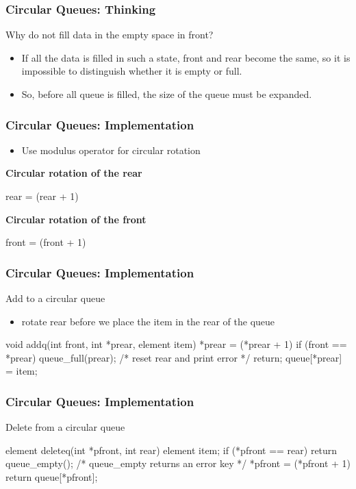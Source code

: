 \documentclass[newPxFont,sthlmFooter,nooffset]{beamer}
\begin{document}
\begin{frame}[t, fragile]
	\frametitle{Circular Queues: Thinking}
	Why do not fill data in the empty space in front?

\begin{itemize}
	\item If all the data is filled in such a state, front and rear become the same, so it is impossible to distinguish whether it is empty or full.
	\item So, before all queue is filled, the size of the queue must be expanded.
\end{itemize}

\end{frame}

\begin{frame}[t, fragile]
  \frametitle{Circular Queues: Implementation}
  \begin{itemize}
  \item Use modulus operator for circular rotation
  \end{itemize}
\bigskip
\textbf{Circular rotation of the rear}
\begin{codedef}
rear = (rear + 1) %
\end{codedef}

\textbf{Circular rotation of the front}
\begin{codedef}
front = (front + 1) %
\end{codedef}
\end{frame}

\begin{frame}[t, fragile]
  \frametitle{Circular Queues: Implementation}
Add to a circular queue
\begin{itemize}
\item rotate rear before we place the item in the rear of the queue
\end{itemize}

\begin{ncodedef}
void addq(int front, int *prear, element item){
    *prear = (*prear + 1)  %
    if (front == *prear) {
        queue_full(prear);
            /* reset rear and print error */
        return;
    }
    queue[*prear] = item;
}
\end{ncodedef}
\end{frame}

\begin{frame}[t, fragile]
  \frametitle{Circular Queues: Implementation}
Delete from a circular queue

\begin{ncodedef}
element deleteq(int *pfront, int rear){
    element item;
    if (*pfront == rear)
        return queue_empty();
        /* queue_empty returns an error key */
    *pfront = (*pfront + 1) %
    return queue[*pfront];
}
\end{ncodedef}
\end{frame}
\end{document}
